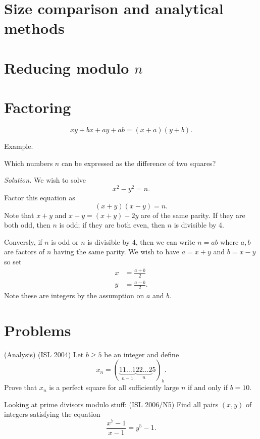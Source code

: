 \section{Size comparison and analytical methods}
\section{Reducing modulo $n$}
\section{Factoring}
\begin{pr}
\[
xy+bx+ay+ab=(x+a)(y+b).
\]
\end{pr}
Example.
\begin{ex}
Which numbers $n$ can be expressed as the difference of two squares?
\end{ex}
{\it Solution.}
We wish to solve
\[
x^2-y^2=n.
\]
Factor this equation as
\[
(x+y)(x-y)=n.
\]
Note that $x+y$ and $x-y=(x+y)-2y$ are of the same parity. If they are both odd, then $n$ is odd; if they are both even, then $n$ is divisible by 4.

Conversly, if $n$ is odd or $n$ is divisible by 4, then we can write $n=ab$ where $a,b$ are factors of $n$ having the same parity. We wish to have $a=x+y$ and $b=x-y$ so set
\begin{align*}
x&=\frac{a+b}{2}\\
y&=\frac{a-b}{2}.
\end{align*}
Note these are integers by the assumption on $a$ and $b$.
\section{Problems}
(Analysis)
(ISL 2004) Let $b\ge 5$ be an integer and define
\[
x_n=(\underbrace{11\ldots 1}_{n-1}\underbrace{22\ldots 2}_n5)_b.
\]
Prove that $x_n$ is a perfect square for all sufficiently large $n$ if and only if $b=10$.

Looking at prime divisors modulo stuff:
(ISL 2006/N5) Find all pairs $(x,y)$ of integers satisfying the equation
\[
\frac{x^7-1}{x-1}=y^5-1.
\]


